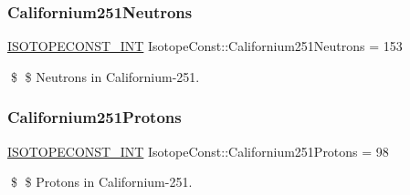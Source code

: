 \subsubsection{\texorpdfstring{Californium251\+Neutrons}{Californium251Neutrons}}
{\footnotesize\ttfamily \mbox{\hyperlink{group___isotope_const-_macros_ga5f18360b3e99483a35c32d789e62621c}{I\+S\+O\+T\+O\+P\+E\+C\+O\+N\+S\+T\+\_\+\+I\+NT}} Isotope\+Const\+::\+Californium251\+Neutrons = 153}

\$ \$ Neutrons in Californium-\/251. \mbox{\label{group___isotope_const-_californium-_cf251_ga1c771f765d0150dd37f8a22efcb89552}} 
\subsubsection{\texorpdfstring{Californium251\+Protons}{Californium251Protons}}
{\footnotesize\ttfamily \mbox{\hyperlink{group___isotope_const-_macros_ga5f18360b3e99483a35c32d789e62621c}{I\+S\+O\+T\+O\+P\+E\+C\+O\+N\+S\+T\+\_\+\+I\+NT}} Isotope\+Const\+::\+Californium251\+Protons = 98}

\$ \$ Protons in Californium-\/251. 